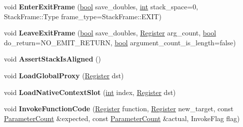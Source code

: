 \begin{DoxyCompactItemize}
\item 
\mbox{\label{classv8_1_1internal_1_1MacroAssembler_ab0efeeb5ce8ac90b32ce83e0c66b00d7}} 
void {\bfseries Enter\+Exit\+Frame} (\mbox{\hyperlink{classbool}{bool}} save\+\_\+doubles, \mbox{\hyperlink{classint}{int}} stack\+\_\+space=0, Stack\+Frame\+::\+Type frame\+\_\+type=Stack\+Frame\+::\+E\+X\+IT)
\item 
\mbox{\label{classv8_1_1internal_1_1MacroAssembler_a0759408b62c9c70233c985bcc1e57b44}} 
void {\bfseries Leave\+Exit\+Frame} (\mbox{\hyperlink{classbool}{bool}} save\+\_\+doubles, \mbox{\hyperlink{classv8_1_1internal_1_1Register}{Register}} arg\+\_\+count, \mbox{\hyperlink{classbool}{bool}} do\+\_\+return=N\+O\+\_\+\+E\+M\+I\+T\+\_\+\+R\+E\+T\+U\+RN, \mbox{\hyperlink{classbool}{bool}} argument\+\_\+count\+\_\+is\+\_\+length=false)
\item 
\mbox{\label{classv8_1_1internal_1_1MacroAssembler_a5b604d2f2df7820700ef88a5057f3047}} 
void {\bfseries Assert\+Stack\+Is\+Aligned} ()
\item 
\mbox{\label{classv8_1_1internal_1_1MacroAssembler_a8139c3ce1dd60f65909755011ef7f9d1}} 
void {\bfseries Load\+Global\+Proxy} (\mbox{\hyperlink{classv8_1_1internal_1_1Register}{Register}} dst)
\item 
\mbox{\label{classv8_1_1internal_1_1MacroAssembler_abb9c73f938328171318c7cc010a7b53c}} 
void {\bfseries Load\+Native\+Context\+Slot} (\mbox{\hyperlink{classint}{int}} index, \mbox{\hyperlink{classv8_1_1internal_1_1Register}{Register}} dst)
\item 
\mbox{\label{classv8_1_1internal_1_1MacroAssembler_a45a3612fb3be7000eb94309ac385674b}} 
void {\bfseries Invoke\+Function\+Code} (\mbox{\hyperlink{classv8_1_1internal_1_1Register}{Register}} function, \mbox{\hyperlink{classv8_1_1internal_1_1Register}{Register}} new\+\_\+target, const \mbox{\hyperlink{classv8_1_1internal_1_1ParameterCount}{Parameter\+Count}} \&expected, const \mbox{\hyperlink{classv8_1_1internal_1_1ParameterCount}{Parameter\+Count}} \&actual, Invoke\+Flag flag)
\item 

\end{DoxyCompactItemize}
